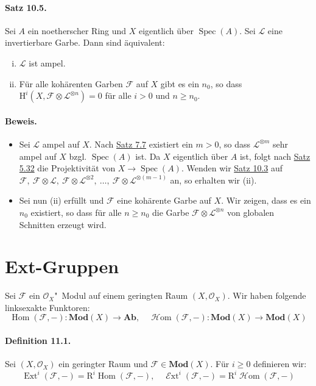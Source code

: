 \paragraph{Satz 10.5.}\label{10.5} Sei $A$ ein noetherscher Ring und $X$ eigentlich über $\operatorname{Spec}(A)$. Sei $\mathcal{L}$ eine invertierbare Garbe. Dann sind äquivalent:
\begin{enumerate}[(i)]
\item $\mathcal{L}$ ist ampel.
\item Für alle kohärenten Garben $\mathcal{F}$ auf $X$ gibt es ein $n_0$, so dass $\mathrm{H}^i(X,\mathcal{F}\otimes \mathcal{L}^{\otimes n})=0$ für alle $i>0$ und $n\geq n_0$.
\end{enumerate}

\paragraph{Beweis.} \begin{itemize}
\item Sei $\mathcal{L}$ ampel auf $X$. Nach \hyperref[7.7]{Satz 7.7} existiert ein $m>0$, so dass $\mathcal{L}^{\otimes m}$ sehr ampel auf $X$ bzgl. $\operatorname{Spec}(A)$ ist. Da $X$ eigentlich über $A$ ist, folgt nach \hyperref[5.32]{Satz 5.32} die Projektivität von $X\to\operatorname{Spec}(A)$. Wenden wir \hyperref[10.3]{Satz 10.3} auf $\mathcal{F},\ \mathcal{F}\otimes\mathcal{L},\ \mathcal{F}\otimes\mathcal{L}^{\otimes 2},\ \ldots,\ \mathcal{F}\otimes\mathcal{L}^{\otimes (m-1)}$ an, so erhalten wir (ii).
\item Sei nun (ii) erfüllt und $\mathcal{F}$ eine kohärente Garbe auf $X$. Wir zeigen, dass es ein $n_0$ existiert, so dass für alle $n\geq n_0$ die Garbe $\mathcal{F}\otimes\mathcal{L}^{\otimes n}$ von globalen Schnitten erzeugt wird.
\end{itemize}

\section{Ext-Gruppen}

Sei $\mathcal{F}$ ein $\mathcal{O}_X$"~Modul auf einem geringten Raum $(X,\mathcal{O}_X)$. Wir haben folgende linksexakte Funktoren:
\[\operatorname{Hom}(\mathcal{F},-):\mathbf{Mod}(X)\to\mathbf{Ab},\quad\operatorname{\mathcal{H}om}(\mathcal{F},-):\mathbf{Mod}(X)\to\mathbf{Mod}(X) \]

\paragraph{Definition 11.1.}\label{11.1} Sei $(X,\mathcal{O}_X)$ ein geringter Raum und $\mathcal{F}\in\mathbf{Mod}(X)$. Für $i\geq 0$ definieren wir:
\[\operatorname{Ext}^i(\mathcal{F},-)=\mathrm{R}^i\operatorname{Hom}(\mathcal{F},-),\quad\operatorname{\mathcal{E}xt}^i(\mathcal{F},-) =\mathrm{R}^i\operatorname{\mathcal{H}om}(\mathcal{F},-) \]

